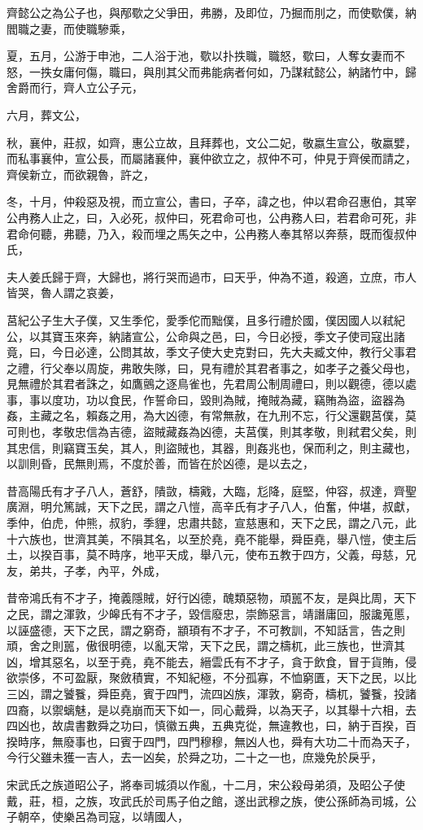 \documentclass{ctexart}
\begin{document}
齊懿公之為公子也，與邴歜之父爭田，弗勝，及即位，乃掘而刖之，而使歜僕，納閻職之妻，而使職驂乘，

夏，五月，公游于申池，二人浴于池，歜以扑抶職，職怒，歜曰，人奪女妻而不怒，一抶女庸何傷，職曰，與刖其父而弗能病者何如，乃謀弒懿公，納諸竹中，歸舍爵而行，齊人立公子元，

六月，葬文公，

秋，襄仲，莊叔，如齊，惠公立故，且拜葬也，文公二妃，敬嬴生宣公，敬嬴嬖，而私事襄仲，宣公長，而屬諸襄仲，襄仲欲立之，叔仲不可，仲見于齊侯而請之，齊侯新立，而欲親魯，許之，

冬，十月，仲殺惡及視，而立宣公，書曰，子卒，諱之也，仲以君命召惠伯，其宰公冉務人止之，曰，入必死，叔仲曰，死君命可也，公冉務人曰，若君命可死，非君命何聽，弗聽，乃入，殺而埋之馬矢之中，公冉務人奉其帑以奔蔡，既而復叔仲氏，

夫人姜氏歸于齊，大歸也，將行哭而過市，曰天乎，仲為不道，殺適，立庶，市人皆哭，魯人謂之哀姜，

莒紀公子生大子僕，又生季佗，愛季佗而黜僕，且多行禮於國，僕因國人以弒紀公，以其寶玉來奔，納諸宣公，公命與之邑，曰，今日必授，季文子使司寇出諸竟，曰，今日必達，公問其故，季文子使大史克對曰，先大夫臧文仲，教行父事君之禮，行父奉以周旋，弗敢失隊，曰，見有禮於其君者事之，如孝子之養父母也，見無禮於其君者誅之，如鷹鸇之逐鳥雀也，先君周公制周禮曰，則以觀德，德以處事，事以度功，功以食民，作誓命曰，毀則為賊，掩賊為藏，竊賄為盜，盜器為姦，主藏之名，賴姦之用，為大凶德，有常無赦，在九刑不忘，行父還觀莒僕，莫可則也，孝敬忠信為吉德，盜賊藏姦為凶德，夫莒僕，則其孝敬，則弒君父矣，則其忠信，則竊寶玉矣，其人，則盜賊也，其器，則姦兆也，保而利之，則主藏也，以訓則昏，民無則焉，不度於善，而皆在於凶德，是以去之，

昔高陽氏有才子八人，蒼舒，隤敳，檮戭，大臨，尨降，庭堅，仲容，叔達，齊聖廣淵，明允篤誠，天下之民，謂之八愷，高辛氏有才子八人，伯奮，仲堪，叔獻，季仲，伯虎，仲熊，叔豹，季貍，忠肅共懿，宣慈惠和，天下之民，謂之八元，此十六族也，世濟其美，不隕其名，以至於堯，堯不能舉，舜臣堯，舉八愷，使主后土，以揆百事，莫不時序，地平天成，舉八元，使布五教于四方，父義，母慈，兄友，弟共，子孝，內平，外成，

昔帝鴻氏有不才子，掩義隱賊，好行凶德，醜類惡物，頑嚚不友，是與比周，天下之民，謂之渾敦，少皞氏有不才子，毀信廢忠，崇飾惡言，靖譖庸回，服讒蒐慝，以誣盛德，天下之民，謂之窮奇，顓頊有不才子，不可教訓，不知話言，告之則頑，舍之則嚚，傲很明德，以亂天常，天下之民，謂之檮杌，此三族也，世濟其凶，增其惡名，以至于堯，堯不能去，縉雲氏有不才子，貪于飲食，冒于貨賄，侵欲崇侈，不可盈厭，聚斂積實，不知紀極，不分孤寡，不恤窮匱，天下之民，以比三凶，謂之饕餮，舜臣堯，賓于四門，流四凶族，渾敦，窮奇，檮杌，饕餮，投諸四裔，以禦螭魅，是以堯崩而天下如一，同心戴舜，以為天子，以其舉十六相，去四凶也，故虞書數舜之功曰，慎徽五典，五典克從，無違教也，曰，納于百揆，百揆時序，無廢事也，曰賓于四門，四門穆穆，無凶人也，舜有大功二十而為天子，今行父雖未獲一吉人，去一凶矣，於舜之功，二十之一也，庶幾免於戾乎，

宋武氏之族道昭公子，將奉司城須以作亂，十二月，宋公殺母弟須，及昭公子使戴，莊，桓，之族，攻武氏於司馬子伯之館，遂出武穆之族，使公孫師為司城，公子朝卒，使樂呂為司寇，以靖國人，
\end{document}
